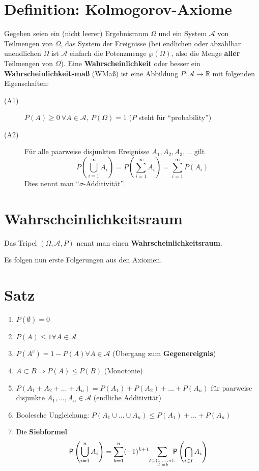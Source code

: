 \section{Definition: Kolmogorov-Axiome}

Gegeben seien ein (nicht leerer) Ergebnisraum $\Omega$ und ein System $\mathcal{A}$ von Teilmengen von $\Omega$, das System der Ereignisse (bei endlichen oder abzählbar unendlichen $\Omega$ ist $\mathcal{A}$ einfach die Potenzmenge $\wp(\Omega)$, also die Menge \textbf{aller} Teilmengen von $\Omega$).
Eine \textbf{Wahrscheinlichkeit} oder besser ein \textbf{Wahrscheinlichkeitsmaß} (WMaß) ist eine Abbildung $P:\mathcal{A} \rightarrow \mathbb{R}$ mit folgenden Eigenschaften:
\begin{description}
 \item[(A1)] $P(A)\geq 0\ \forall A \in \mathcal{A},\ P(\Omega)=1$ ($P$ steht für ``probability'')
 \item[(A2)] Für alle paarweise disjunkten Ereignisse $A_1,A_2,A_3,\ldots$ gilt
 \begin{displaymath}
	P(\bigcup_{i=1}^\infty A_i) = P(\sum_{i=1}^\infty A_i) = \sum_{i=1}^\infty P(A_i)
 \end{displaymath}
 Dies nennt man ``$\sigma$-Additivität''.
\end{description}

\section{Wahrscheinlichkeitsraum}
Das Tripel $(\Omega,\mathcal{A},P)$ nennt man einen \textbf{Wahrscheinlichkeitsraum}.

\noindent Es folgen nun erste Folgerungen aus den Axiomen.

\section{Satz}
\renewcommand{\labelitemi}{\alph}
\begin{enumerate}
	\item $P(\emptyset) = 0$
	\item $P(A) \leq 1 \forall A \in \mathcal{A}$
	\item $P(A^c) = 1 - P(A) \forall A \in \mathcal{A}$ (Übergang zum \textbf{Gegenereignis})
	\item $A \subset B \Rightarrow P(A) \leq P(B)$ (Monotonie)
	\item $P(A_1 + A_2 + \ldots + A_n) = P(A_1) + P(A_2) + \ldots + P(A_n)$ für paarweise disjunkte $A_1,\ldots,A_n \in \mathcal{A}$ (endliche Additivität)
	\item Boolesche Ungleichung: $P(A_1 \cup \ldots \cup A_n) \leq P(A_1) + \ldots + P(A_n)$
	\item Die \textbf{Siebformel}
	\[
		\mathsf{P}\left(\bigcup_{i=1}^nA_i\right) = \sum_{k=1}^n(-1)^{k+1}\!\!\sum_{I\subseteq\{1,\dots,n\},\atop |I|=k}\!\!\!\!\mathsf{P}\left(\bigcap_{i\in I}A_i\right)
	\]
\end{enumerate}

